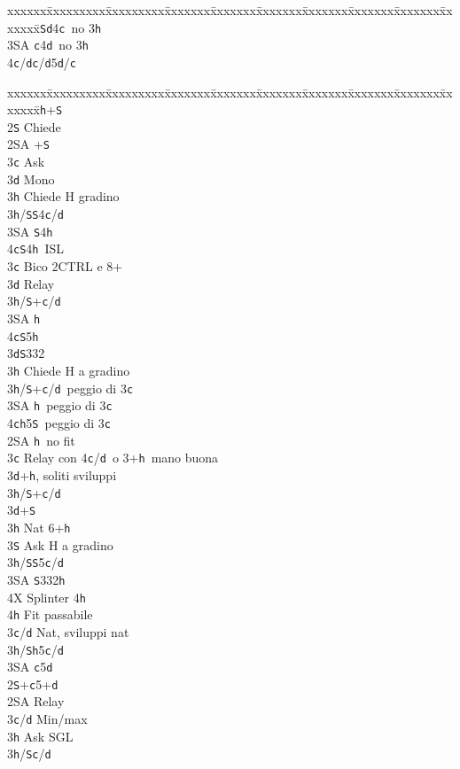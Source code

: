 \documentclass[a4paper,italian]{article}
\newcommand{\BS}{\small{\texttt{S}}}
\newcommand{\BC}{\small{\texttt{c}}}
\newcommand{\BD}{\small{\texttt{d}}}
\newcommand{\BH}{\small{\texttt{h}}}
\newenvironment{bidtable}
{\begin{tabbing}

    xxxxxx\=xxxxxxxxx\=xxxxxxxxx\=xxxxxxx\=xxxxxxx\=xxxxxxx\=xxxxxxx\=xxxxxxx\=xxxxxxx\=xxxxxxx\=\kill}
{\end{tabbing} }%
\begin{document}
\begin{multicols}{2}
\begin{bidtable}
        3\BS {}\BD 4\BC\ no 3\BH \\
        3\small{SA} \BC 4\BD\ no 3\BH \\
        4\BC/\BD {}\BC /\BD 5\BD /\BC\\
    \end{bidtable}
    \columnbreak
    \begin{bidtable}
        2\BH {}+\BS \+\\
        2\BS \> Chiede\+\\
        2\small{SA} +\BS \+\\
        3\BC \> Ask\+\\
        3\BD \> Mono\+\\
        3\BH \> Chiede H gradino\-\\
        3\BH/\BS {}\BS 4\BC /\BD \\
        3\small{SA} \BS 4\BH \\
        4\BC {}\BS 4\BH\ ISL\-\-\\
        3\BC \> Bico 2CTRL e 8+\+\\
        3\BD \> Relay\+\\
        3\BH/\BS {}+\BC /\BD \\
        3\small{SA} \BH \\
        4\BC {}\BS 5\BH \-\-\\
        3\BD {}\BS 332\+\\
        3\BH \> Chiede H a gradino\-\\
        3\BH/\BS {}+\BC /\BD\ peggio di 3\BC \\
        3\small{SA} \BH\ peggio di 3\BC \\
        4\BC {}\BH 5\BS\ peggio di 3\BC \-\\
        2\small{SA} \BH\ no fit\+\\
        3\BC \> Relay con 4\BC/\BD\ o 3+\BH\ mano buona\+\\
        3\BD {}+\BH, soliti sviluppi\\
        3\BH/\BS {}+\BC /\BD \-\\
        3\BD {}+\BS \+\\
        3\BH \> Nat 6+\BH\\
        3\BS \> Ask H a gradino\-\\
        3\BH/\BS {}\BS 5\BC /\BD \\
        3\small{SA} \BS 332\BH \\
        4X \> Splinter 4\BH \\
        4\BH \> Fit passabile\-\\
        3\BC/\BD \> Nat, sviluppi nat\\
        3\BH/\BS {}\BH 5\BC /\BD \\
        3\small{SA} \BC 5\BD \-\\
        2\BS {}+\BC 5+\BD \+\\
        2\small{SA} \> Relay\+\\
        3\BC/\BD \> Min/max\+\\
        3\BH \> Ask SGL\-\\
        3\BH/\BS {}\BC /\BD
    \end{bidtable}
\end{multicols}
\end{document}
